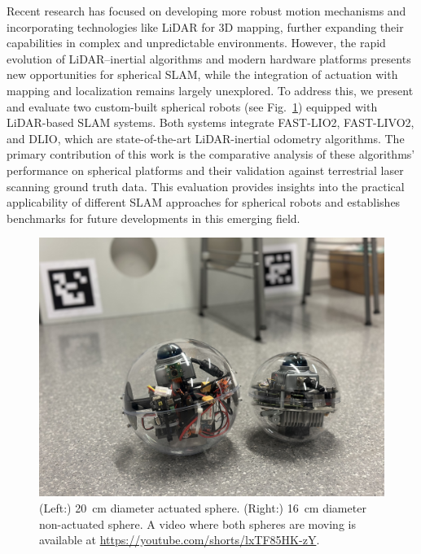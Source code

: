 \documentclass[english, bachelor, utf8]{base/thesis_telematics}
\begin{document}
Recent research has focused on developing more robust motion mechanisms \cite{roboball,novelsphere,pendulum_sphere} and incorporating technologies like LiDAR for 3D mapping, further expanding their capabilities in complex and unpredictable environments\cite{Kalman_filter_sphere,DAEDALUS,sphere_Fabi_1}.
However, the rapid evolution of LiDAR–inertial algorithms and modern hardware platforms presents new opportunities for spherical SLAM, while the integration of actuation with mapping and localization remains largely unexplored.
To address this, we present and evaluate two custom-built spherical robots (see Fig.~\ref{fig:twospheres}) equipped with LiDAR-based SLAM systems.
Both systems integrate FAST-LIO2\cite{fastlio2}, FAST-LIVO2\cite{fastlivo2}, and DLIO\cite{dlio}, which are state-of-the-art LiDAR-inertial odometry algorithms.
The primary contribution of this work is the comparative analysis of these algorithms' performance on spherical platforms and their validation against terrestrial laser scanning ground truth data.
This evaluation provides insights into the practical applicability of different SLAM approaches for spherical robots and establishes benchmarks for future developments in this emerging field.

\begin{figure}[ht]
\centerline{\includegraphics[width=\columnwidth]{pics/two_spheres.jpg}}
\caption{(Left:) \SI{20}{\centi\meter} diameter actuated sphere.
(Right:) \SI{16}{\centi\meter} diameter non-actuated sphere.
A video where both spheres are moving is available at \url{https://youtube.com/shorts/lxTF85HK-zY}.}
\vspace{-15pt}
\label{fig:twospheres}
\end{figure}
\end{document}
